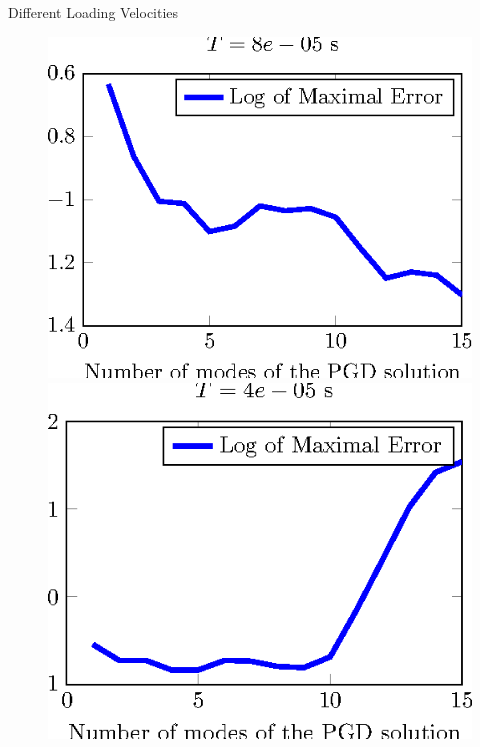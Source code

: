 \documentclass[12pt]{beamer}
\begin{document}
\begin{frame}{Different Loading Velocities}
\begin{figure}
\begin{minipage}{0.24\linewidth}
			\includegraphics[width=1\linewidth]{Error-CalculSchem3-T2-tikz.eps}
		\end{minipage}
		\begin{minipage}{0.24\linewidth}
			\includegraphics[width=1\linewidth]{Error-CalculSchem3-T1-tikz.eps}
		\end{minipage}
	\end{figure}
\end{frame}
\end{document}
